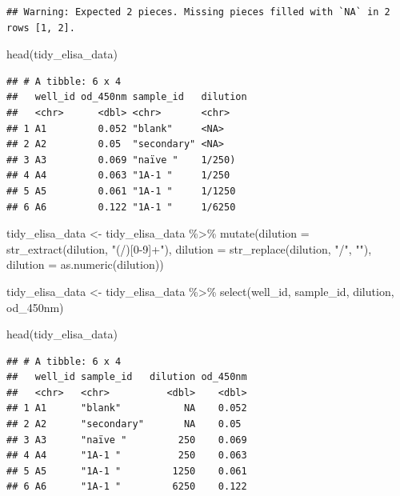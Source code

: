 \documentclass[
]{book}
\newenvironment{Shaded}{\begin{snugshade}}{\end{snugshade}}
\newcommand{\AttributeTok}[1]{\textcolor[rgb]{0.77,0.63,0.00}{#1}}
\newcommand{\FunctionTok}[1]{\textcolor[rgb]{0.00,0.00,0.00}{#1}}
\newcommand{\NormalTok}[1]{#1}
\newcommand{\OtherTok}[1]{\textcolor[rgb]{0.56,0.35,0.01}{#1}}
\newcommand{\SpecialCharTok}[1]{\textcolor[rgb]{0.00,0.00,0.00}{#1}}
\newcommand{\StringTok}[1]{\textcolor[rgb]{0.31,0.60,0.02}{#1}}
\begin{document}
\begin{verbatim}
## Warning: Expected 2 pieces. Missing pieces filled with `NA` in 2 rows [1, 2].
\end{verbatim}

\begin{Shaded}
\begin{Highlighting}[]
\FunctionTok{head}\NormalTok{(tidy\_elisa\_data)}
\end{Highlighting}
\end{Shaded}

\begin{verbatim}
## # A tibble: 6 x 4
##   well_id od_450nm sample_id   dilution
##   <chr>      <dbl> <chr>       <chr>   
## 1 A1         0.052 "blank"     <NA>    
## 2 A2         0.05  "secondary" <NA>    
## 3 A3         0.069 "naïve "    1/250)  
## 4 A4         0.063 "1A-1 "     1/250   
## 5 A5         0.061 "1A-1 "     1/1250  
## 6 A6         0.122 "1A-1 "     1/6250
\end{verbatim}

\begin{Shaded}
\begin{Highlighting}[]
\NormalTok{tidy\_elisa\_data }\OtherTok{\textless{}{-}}\NormalTok{ tidy\_elisa\_data }\SpecialCharTok{\%\textgreater{}\%}
  \FunctionTok{mutate}\NormalTok{(}\AttributeTok{dilution =} \FunctionTok{str\_extract}\NormalTok{(dilution, }\StringTok{"(/)[0{-}9]+"}\NormalTok{),}
         \AttributeTok{dilution =} \FunctionTok{str\_replace}\NormalTok{(dilution, }\StringTok{"/"}\NormalTok{, }\StringTok{""}\NormalTok{),}
         \AttributeTok{dilution =} \FunctionTok{as.numeric}\NormalTok{(dilution))}

\NormalTok{tidy\_elisa\_data }\OtherTok{\textless{}{-}}\NormalTok{ tidy\_elisa\_data }\SpecialCharTok{\%\textgreater{}\%}
  \FunctionTok{select}\NormalTok{(well\_id, sample\_id, dilution, od\_450nm)}

\FunctionTok{head}\NormalTok{(tidy\_elisa\_data)}
\end{Highlighting}
\end{Shaded}

\begin{verbatim}
## # A tibble: 6 x 4
##   well_id sample_id   dilution od_450nm
##   <chr>   <chr>          <dbl>    <dbl>
## 1 A1      "blank"           NA    0.052
## 2 A2      "secondary"       NA    0.05 
## 3 A3      "naïve "         250    0.069
## 4 A4      "1A-1 "          250    0.063
## 5 A5      "1A-1 "         1250    0.061
## 6 A6      "1A-1 "         6250    0.122
\end{verbatim}
\end{document}
